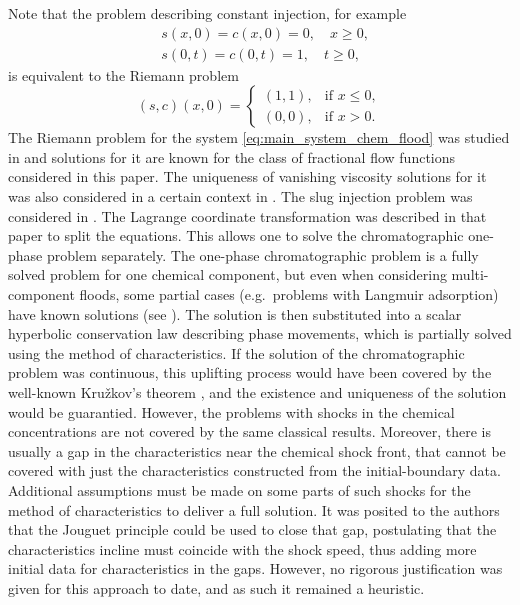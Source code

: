 \documentclass[12pt]{article}
\renewcommand{\leq}{\leqslant}
\theoremstyle{definition}
\begin{document}
Note that the problem describing constant injection, for example
\begin{align*}
&s(x, 0) = c(x, 0) = 0, \quad x\geqslant 0, \\
&s(0, t) = c(0, t) = 1, \quad t\geqslant 0,
\end{align*}
is equivalent to the Riemann problem
\begin{equation*}
    (s,c)(x,0)=
    \begin{cases}
        (1,1),& \text{if } x\leq 0,\\
        (0,0),& \text{if } x>0.
    \end{cases}
\end{equation*}
The Riemann problem for the system \eqref{eq:main_system_chem_flood} was studied in \cite{JnW} and solutions for it are known for the class of fractional flow functions considered in this paper. The uniqueness of vanishing viscosity solutions for it was also considered in a certain context in \cite{Shen}. The slug injection problem was considered in \cite{PiBeSh06}. The Lagrange coordinate transformation was described in that paper to split the equations. This allows one to solve the chromatographic one-phase problem separately. The one-phase chromatographic problem is a fully solved problem for one chemical component, but even when considering multi-component floods, some partial cases (e.g.~problems with Langmuir adsorption) have known solutions (see \cite{RheeAmundson}). The solution is then substituted into a scalar hyperbolic conservation law describing phase movements, which is partially solved using the method of characteristics. If the solution of the chromatographic problem was continuous, this uplifting process would have been covered by the well-known Kru\v{z}kov's theorem \cite{Kruzhkov}, and the existence and uniqueness of the solution would be guarantied. However, the problems with shocks in the chemical concentrations are not covered by the same classical results. Moreover, there is usually a gap in the characteristics near the chemical shock front, that cannot be covered with just the characteristics constructed from the initial-boundary data. Additional assumptions must be made on some parts of such shocks for the method of characteristics to deliver a full solution. It was posited to the authors that the Jouguet principle could be used to close that gap, postulating that the characteristics incline must coincide with the shock speed, thus adding more initial data for characteristics in the gaps. However, no rigorous justification was given for this approach to date, and as such it remained a heuristic.
\end{document}
